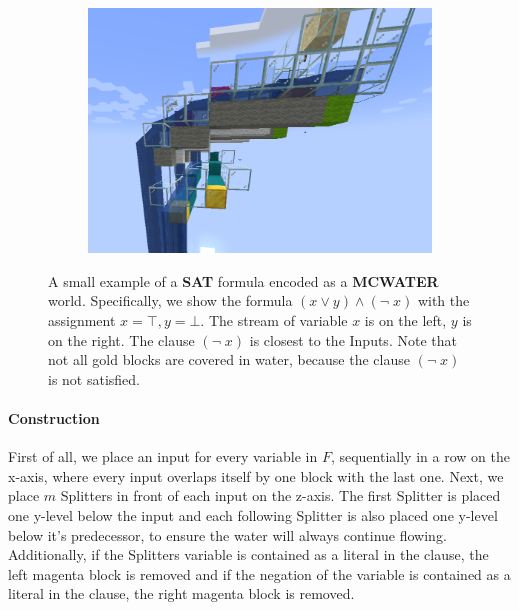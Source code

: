 \begin{figure}[h]
\begin{subfigure}{.33\textwidth}
\end{subfigure}
\begin{subfigure}{.33\textwidth}
  \centering
  \includegraphics[width=.9\linewidth]{images/small_example_side.png}
\end{subfigure}
\caption{A small example of a \textbf{SAT} formula encoded as a \textbf{MCWATER} world. Specifically, we show the formula $(x \vee y) \wedge (\neg \; x)$ with the assignment $x = \top, y = \bot$. The stream of variable $x$ is on the left, $y$ is on the right. The clause $(\neg \; x)$ is closest to the Inputs. Note that not all gold blocks are covered in water, because the clause $(\neg \; x)$ is not satisfied.}
\label{fig:small-example}
\end{figure}



\paragraph{Construction} \label{npcomplete:construction}
First of all, we place an input for every variable in $F$, sequentially in a row on the x-axis, where every input overlaps itself by one block with the last one.
\newline\noindent Next, we place $m$ Splitters in front of each input on the z-axis. The first Splitter is placed one y-level below the input and each following Splitter is also placed one y-level below it's predecessor, to ensure the water will always continue flowing. Additionally, if the Splitters variable is contained  as a literal in the clause, the left magenta block is removed and if the negation of the variable is contained  as a literal in the clause, the right magenta block is removed.
\linebreak

